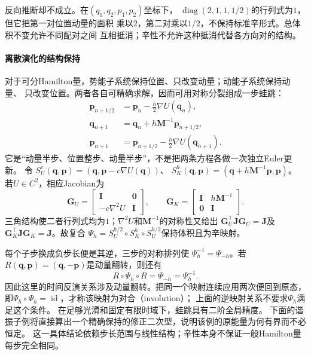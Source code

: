 反向推断却不成立。在$(q_1,q_2,p_1,p_2)$坐标下，
$\operatorname{diag}(2,1,1,1/2)$的行列式为$1$，但它把第一对位置动量的面积
乘以$2$，第二对乘以$1/2$，不保持标准辛形式。总体积不变允许不同配对之间
互相抵消；辛性不允许这种抵消代替各方向对的结构。

\paragraph{离散演化的结构保持}
对于可分Hamilton量，势能子系统保持位置、只改变动量；动能子系统保持动量、
只改变位置。两者各自可精确求解，因而可用对称分裂组成一步蛙跳：
\begin{align}
  \bm p_{n+1/2}&=\bm p_n-\frac h2\nabla U(\bm q_n),
    \label{eq:dynamical-leapfrog-half-momentum}\\
  \bm q_{n+1}&=\bm q_n+h\bm M^{-1}\bm p_{n+1/2},
    \label{eq:dynamical-leapfrog-position}\\
  \bm p_{n+1}&=\bm p_{n+1/2}-\frac h2\nabla U(\bm q_{n+1}).
    \label{eq:dynamical-leapfrog-final-momentum}
\end{align}
它是“动量半步、位置整步、动量半步”，不是把两条方程各做一次独立Euler更新。
令
$S_U^c(\bm q,\bm p)=(\bm q,\bm p-c\nabla U(\bm q))$、
$S_K^h(\bm q,\bm p)=(\bm q+h\bm M^{-1}\bm p,\bm p)$。
若$U\in C^2$，相应Jacobian为
\[
  \bm G_U=\begin{bmatrix}\bm I&\bm0\\-c\nabla^2U&\bm I\end{bmatrix},
  \qquad
  \bm G_K=\begin{bmatrix}\bm I&h\bm M^{-1}\\\bm0&\bm I\end{bmatrix}.
\]
三角结构使二者行列式均为$1$；$\nabla^2U$和$\bm M^{-1}$的对称性又给出
$\bm G_U^\top\bm J\bm G_U=\bm J$及
$\bm G_K^\top\bm J\bm G_K=\bm J$。故复合
$\Psi_h=S_U^{h/2}\circ S_K^h\circ S_U^{h/2}$保持体积且为辛映射。

每个子步换成负步长便是其逆，三步的对称排列使
$\Psi_h^{-1}=\Psi_{-h}$。若$R(\bm q,\bm p)=(\bm q,-\bm p)$是动量翻转，则还有
\[
  R\circ\Psi_h\circ R=\Psi_{-h}=\Psi_h^{-1}.
\]
因此这里的时间反演关系涉及动量翻转。把同一个映射连续应用两次便回到原态，
即$\Psi_h\circ\Psi_h=\operatorname{id}$，才称该映射为对合（involution）；
上面的逆映射关系不要求$\Psi_h$满足这个条件。
在足够光滑和固定有限时域下，蛙跳具有二阶全局精度。
下面的谐振子例将直接算出一个精确保持的修正二次型，说明该例的原能量为何有界而不必恒定。
这一具体结论依赖步长范围与线性结构；辛性本身不保证一般Hamilton量每步完全相同。

